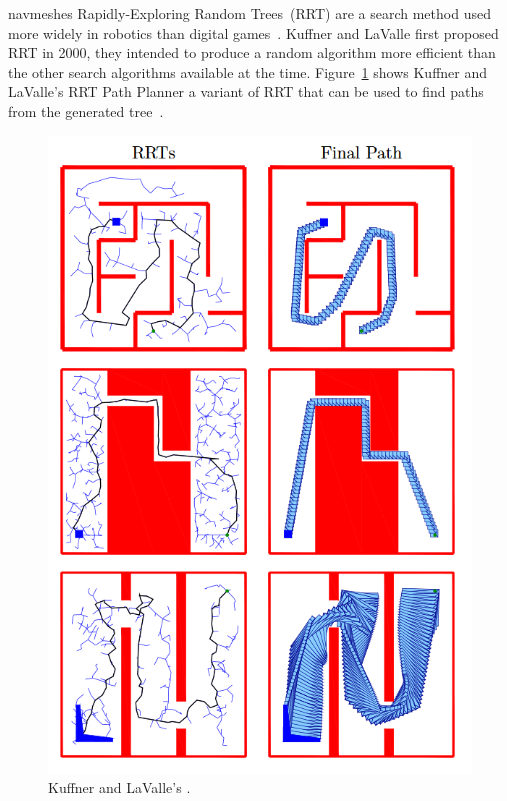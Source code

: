 \documentclass[journal]{IEEEtran}
\begin{document}
navmeshes \cite{Hale2008} \cite{Mendonça2015}
Rapidly-Exploring Random Trees~(RRT) are a search method used more widely in robotics than digital games~\cite{Kuffner2000}. Kuffner and LaValle first proposed RRT in 2000, they intended to produce a random algorithm more efficient than the other search algorithms available at the time. Figure~\ref{KuffnerRRT} shows  Kuffner and LaValle's RRT Path Planner a variant of RRT that can be used to find paths from the generated tree~\cite{Kuffner2000}.

\begin{figure}[h]
	\includegraphics[width=1.0\linewidth]{KuffnerRRT.png}
	\caption{ Kuffner and LaValle's \cite{Kuffner2000}.}
	\label{KuffnerRRT}
\end{figure} 
\end{document}
